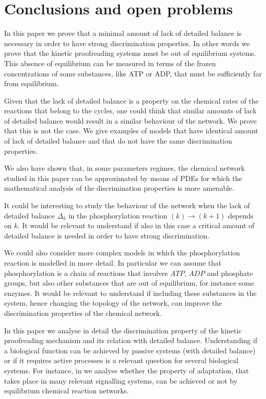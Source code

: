 \documentclass{article}
\numberwithin{equation}{section}
\theoremstyle{plain}
\begin{document}
\section{Conclusions and open problems} 
In this paper we prove that a minimal amount of lack of detailed balance is necessary in order to have strong discrimination properties. In other words we prove that the kinetic proofreading systems must be out of equilibrium systems. This absence of equilibrium can be measured in terms of the frozen concentrations of some substances, like ATP or ADP, that must be sufficiently far from equilibrium. 

Given that the lack of detailed balance is a property on the chemical rates of the reactions that belong to the cycles, one could think that similar amounts of lack of detailed balance would result in a similar behaviour of the network. We prove that this is not the case.  We give examples of models that have identical amount of lack of detailed balance  and that do not have the same discrimination properties.

We also have shown that, in some parameters regimes, the chemical network studied in this paper can be approximated by means of PDEs for which the mathematical analysis of the discrimination properties is more amenable. 

It could be interesting to study the behaviour of the network when the lack of detailed balance $\Delta_k$ in the phosphorylation reaction $(k) \rightarrow (k+1)$ depends on $k$. 
It would be relevant to understand if also in this case a critical amount of detailed balance is needed in order to have strong discrimination. 

We could also consider more complex models in which the phosphorylation reaction is modelled in more detail. In particular we can assume that phosphorylation is a chain of reactions that involves $ATP$, $ADP $ and phosphate groups, but also other substances that are out of equilibrium, for instance some enzymes. It would be relevant to understand if including these substances in the system, hence changing the topology of the network, can improve the discrimination properties of the chemical network. 

In this paper we analyse in detail the discrimination property of the kinetic proofreading mechanism and its relation with detailed balance.
Understanding if a biological function can be achieved by passive systems (with detailed balance) or if it requires active processes is a relevant question for several biological systems.
For instance, in \cite{franco2025adaptation} we analyse whether the property of adaptation, that takes place in many relevant signalling systems, can be achieved or not by equilibrium chemical reaction networks. 
\end{document}
